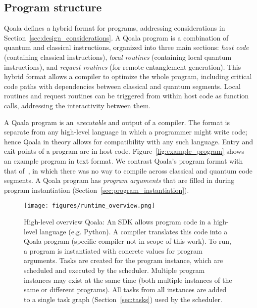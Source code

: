 \subsection{Program structure}
\label{sec:program_structure}
Qoala defines a hybrid format for programs, addressing considerations in Section~\ref{sec:design_considerations}.
A Qoala program is a combination of quantum and classical instructions, 
organized into three main sections: \textit{host code} (containing classical instructions), \textit{local routines} (containing local quantum instructions), 
and \textit{request routines} (for remote entanglement generation).
This hybrid format allows a compiler to optimize the whole program, including critical code paths with dependencies between classical and quantum segments.
Local routines and request routines can be triggered from within host code as function calls, addressing the interactivity between them.

A Qoala program is an \textit{executable} and output of a compiler.
The format is separate from any high-level language in which a programmer might write code; hence Qoala in theory allows for compatibility with any such language.
Entry and exit points of a program are in host code.
Figure~\ref{fig:example_program} shows an example program in text format.
We contrast Qoala's program format with that of~\cite{dahlberg2022netqasm}, in which there was no way to compile across classical and quantum code segments.
A Qoala program has \textit{program arguments} that are filled in during program instantiation (Section~\ref{sec:program_instantiation}).


\begin{figure}%
    \centering
    \texttt{[image: figures/runtime\_overview.png]}
    \caption{High-level overview Qoala: An SDK allows program code in a high-level language (e.g. Python).
    A compiler translates this code into a Qoala program (specific compiler not in scope of this work).
    To run, a program is instantiated with concrete values for program arguments.
    Tasks are created for the program instance, which are scheduled and executed by the scheduler.
    Multiple program instances may exist at the same time (both multiple instances of the same or different programs).
    All tasks from all instances are added to a single task graph (Section~\ref{sec:tasks}) used by the scheduler.
    }
    \label{fig:runtime_overview}
\end{figure}




